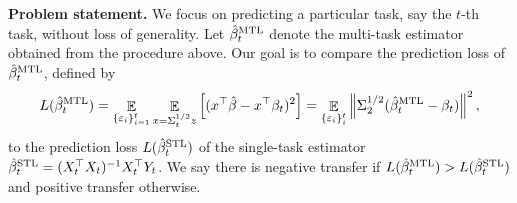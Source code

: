 





\textbf{Problem statement.}
We focus on predicting a particular task, say the $t$-th task, without loss of generality.
Let $\hat{\beta}_t^{\text{MTL}}$ denote the multi-task estimator obtained from the procedure above.
Our goal is to compare the prediction loss of $\hat{\beta}_t^{\text{MTL}}$, defined by
{\small\begin{align*}
		L(\hat{\beta}_t^{\text{MTL}}) = \mathop{\mathbb{E}}_{\{\varepsilon_i\}_{i=1}^t} \mathop{\mathbb{E}}_{x = \Sigma_t^{1/2} z}\left[ ({x}^{\top}\hat{\beta} - {x}^{\top}\beta_t)^2 \right]
		= \mathop{\mathbb{E}}_{\{\varepsilon_i\}_i^t} \left\| \Sigma_2^{1/2} (\hat{\beta}_t^{\text{MTL}} - \beta_t) \right\|^2,
	\end{align*}}%
to the prediction loss $L(\hat{\beta}_t^{\text{STL}})$ of the single-task estimator $\hat{\beta}_t^{\text{STL}} = (X_t^{\top}X_t)^{-1}X_t^{\top}{Y_t}$.
We say there is negative transfer if  $L(\hat{\beta}_t^{\text{MTL}}) > L(\hat{\beta}_t^{\text{STL}})$ and positive transfer otherwise.



